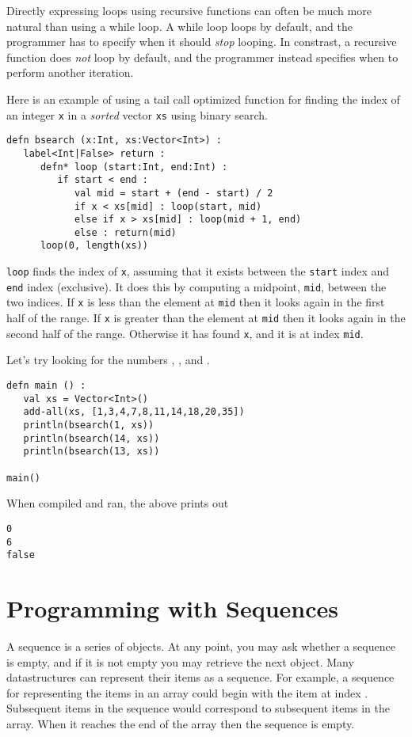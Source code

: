 \documentclass[10pt,oneside]{book}
\begin{document}
Directly expressing loops using recursive functions can often be much more natural than using a while loop. A while loop loops by default, and the programmer has to specify when it should {\em stop} looping. In constrast, a recursive function does {\em not} loop by default, and the programmer instead specifies when to perform another iteration.

Here is an example of using a tail call optimized function for finding the index of an integer \texttt{\frenchspacing x} in a {\em sorted} vector \texttt{\frenchspacing xs} using binary search.
\begin{lstlisting}
defn bsearch (x:Int, xs:Vector<Int>) :
   label<Int|False> return :
      defn* loop (start:Int, end:Int) :
         if start < end :
            val mid = start + (end - start) / 2
            if x < xs[mid] : loop(start, mid)
            else if x > xs[mid] : loop(mid + 1, end)
            else : return(mid)
      loop(0, length(xs))            
\end{lstlisting}
\texttt{\frenchspacing loop} finds the index of \texttt{\frenchspacing x}, assuming that it exists between the \texttt{\frenchspacing start} index and \texttt{\frenchspacing end} index (exclusive). It does this by computing a midpoint, \texttt{\frenchspacing mid}, between the two indices. If \texttt{\frenchspacing x} is less than the element at \texttt{\frenchspacing mid} then it looks again in the first half of the range. If \texttt{\frenchspacing x} is greater than the element at \texttt{\frenchspacing mid} then it looks again in the second half of the range. Otherwise it has found \texttt{\frenchspacing x}, and it is at index \texttt{\frenchspacing mid}.

Let's try looking for the numbers \texttt{}, \texttt{}, and \texttt{}. 
\begin{lstlisting}
defn main () :
   val xs = Vector<Int>()
   add-all(xs, [1,3,4,7,8,11,14,18,20,35])
   println(bsearch(1, xs))
   println(bsearch(14, xs))
   println(bsearch(13, xs))

main()
\end{lstlisting}
When compiled and ran, the above prints out
\begin{lstlisting}
0
6
false
\end{lstlisting}

\chapter{Programming with Sequences}
A sequence is a series of objects. At any point, you may ask whether a sequence is empty, and if it is not empty you may retrieve the next object. Many datastructures can represent their items as a sequence. For example, a sequence for representing the items in an array could begin with the item at index \texttt{}. Subsequent items in the sequence would correspond to subsequent items in the array. When it reaches the end of the array then the sequence is empty.
\end{document}
